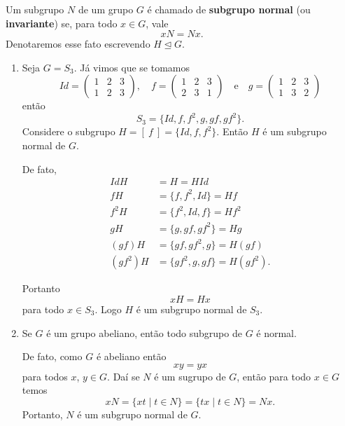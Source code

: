 \begin{definicao}
    Um subgrupo $N$ de um grupo $G$ é chamado de \textbf{subgrupo normal} (ou \textbf{invariante}) se, para todo $x \in G$, vale
    \[
        xN = Nx.
    \]
    Denotaremos esse fato escrevendo $H \unlhd G$.
\end{definicao}

\begin{exemplos}
    \begin{enumerate}[label={\arabic*})]
        \item Seja $G = S_3$. Já vimos que se tomamos
        \[
            Id = \begin{pmatrix}
                1 & 2 & 3\\
                1 & 2 & 3
            \end{pmatrix}, \quad
            f = \begin{pmatrix}
                1 & 2 & 3\\
                2 & 3 & 1
            \end{pmatrix} \quad \mbox{e}\quad
            g = \begin{pmatrix}
                1 & 2 & 3\\
                1 & 3 & 2
            \end{pmatrix}
        \]
        então
        \[
            S_3 = \{Id, f, f^2, g, gf, gf^2\}.
        \]
        Considere o subgrupo $H = [\ f\ ] = \{Id, f, f^2\}$. Então $H$ é um subgrupo normal de $G$.
        \begin{solucao}
            De fato,
            \begin{align*}
                IdH &= H = HId\\
                fH &= \{f, f^2, Id\} = Hf\\
                f^2H &= \{f^2, Id, f\} = Hf^2\\
                gH &= \{g, gf, gf^2\} = Hg\\
                (gf)H &= \{gf, gf^2, g\} = H(gf)\\
                (gf^2)H &= \{gf^2, g, gf\} = H(gf^2).
            \end{align*}

            Portanto
            \[
                xH = Hx
            \]
            para todo $x \in S_3$. Logo $H$ é um subgrupo normal de $S_3$.
        \end{solucao}

        \item Se $G$ é um grupo abeliano, então todo subgrupo de $G$ é normal.
        \begin{solucao}
            De fato, como $G$ é abeliano então
            \[
                xy = yx
            \]
            para todos $x$, $y \in G$. Daí se $N$ é um sugrupo de $G$, então para todo $x \in G$ temos
            \[
                xN = \{xt \mid t \in N\} = \{tx \mid t \in N\} = Nx.
            \]
            Portanto, $N$ é um subgrupo normal de $G$.
        \end{solucao}


\end{enumerate}
\end{exemplos}
